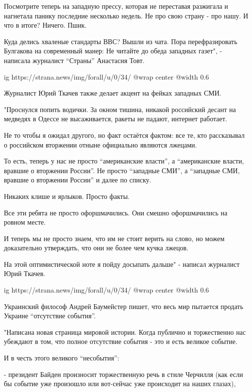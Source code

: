 Посмотрите теперь на западную прессу, которая не переставая разжигала и
нагнетала панику последние несколько недель. Не про свою страну - про нашу. И
что в итоге? Ничего. Пшик.

Куда делись хваленые стандарты ВВС? Вышли из чата. Пора перефразировать
Булгакова на современный манер: Не читайте до обеда западных газет", - написала
журналист \enquote{Страны} Анастасия Товт.

\ifcmt
  ig https://strana.news/img/forall/u/0/34/%
  @wrap center
  @width 0.6
\fi

Журналист Юрий Ткачев также делает акцент на фейках западных СМИ.

"Проснулся попить водички. За окном тишина, никакой российский десант на
медведях в Одессе не высаживается, ракеты не падают, интернет работает.

Не то чтобы я ожидал другого, но факт остаётся фактом: все те, кто рассказывал
о российском вторжении отныне официально являются лжецами.

То есть, теперь у нас не просто \enquote{американские власти}, а \enquote{американские власти,
вравшие о вторжении России}. Не просто \enquote{западные СМИ}, а \enquote{западные СМИ, вравшие
о вторжении России} и далее по списку.

Никаких клише и ярлыков. Просто факты.

Все эти ребята не просто офоршмачились. Они смешно офоршмачились на ровном
месте.

И теперь мы не просто знаем, что им не стоит верить на слово, но можем
доказательно утверждать, что они не более чем кучка лжецов.

На этой оптимистической ноте я пойду досыпать дальше" - написал журналист Юрий
Ткачев.

\ifcmt
  ig https://strana.news/img/forall/u/0/34/%
  @wrap center
  @width 0.6
\fi

Украинский философ Андрей Баумейстер пишет, что весь мир пытается продать
Украине \enquote{отсутствие события}. 

"Написана новая страница мировой истории. Когда публично и торжественно нас
убеждают в том, что полное отсутствие события - это и есть великое событие.

И в честь этого великого \enquote{несобытия}:

- президент Байден произносит торжественную речь в стиле Черчилля (как если бы
событие уже произошло или вот-сейчас уже происходит на наших глазах),

